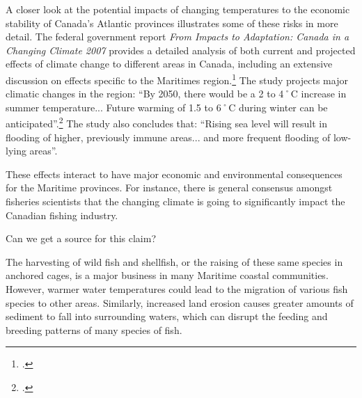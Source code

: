 A closer look at the potential impacts of changing temperatures to the economic stability of Canada's Atlantic provinces illustrates some of these risks in more detail. 
The federal government report \emph{From Impacts to Adaptation: Canada in a Changing Climate 2007} provides a detailed analysis of both current and projected effects of climate change to different areas in Canada, including an extensive discussion on effects specific to the Maritimes region.\footcite[][]{ImpToAda}
The study projects major climatic changes in the region: ``By 2050, there would be a 2 to 4˚C increase in summer temperature... Future warming of 1.5 to 6˚C during winter can be anticipated''.\footcite[][p.131]{ImpToAda}
The study also concludes that: ``Rising sea level will result in flooding of higher, previously immune areas... and more frequent flooding of low-lying areas''.


These effects interact to have major economic and environmental consequences for the Maritime provinces.  
For instance, there is general consensus amongst fisheries scientists that the changing climate is going to significantly impact the Canadian fishing industry.

\begin{vcom}		
Can we get a source for this claim?
\end{vcom}

The harvesting of wild fish and shellfish, or the raising of these same species in anchored cages, is a major business in many Maritime coastal communities.  
However, warmer water temperatures could lead to the migration of various fish species to other areas. 
Similarly, increased land erosion causes greater amounts of sediment to fall into surrounding waters, which can disrupt the feeding and breeding patterns of many species of fish.



